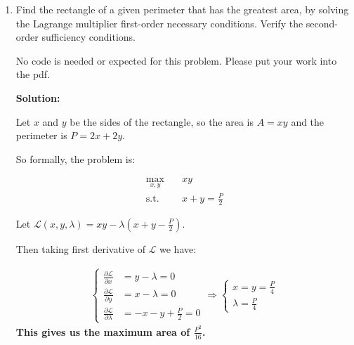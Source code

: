 \documentclass[conference,onecolumn]{IEEEtran}
\begin{document}
\begin{enumerate}
            \clearpage
      \item Find the rectangle of a given perimeter that has the greatest area, by solving the Lagrange multiplier first-order necessary conditions.
            Verify the second-order sufficiency conditions.

            No code is needed or expected for this problem.
            Please put your work into the pdf.

            \textbf{Solution:}

            Let $x$ and $y$ be the sides of the rectangle, so the area is $A = xy$ and the perimeter is $P = 2x + 2y$.

            So formally, the problem is:

            \begin{align*}
                  \max_{x, y} & \quad xy                  \\
                  \text{s.t.} & \quad x + y = \frac{P}{2}
            \end{align*}

            Let $\mathcal{L}(x, y, \lambda) = xy - \lambda(x + y - \frac{P}{2})$.

            Then taking first derivative of $\mathcal{L}$ we have:

            \begin{align*}
                  \begin{cases}
                        \frac{\partial \mathcal{L}}{\partial x}       & = y - \lambda = 0          \\
                        \frac{\partial \mathcal{L}}{\partial y}       & = x - \lambda = 0          \\
                        \frac{\partial \mathcal{L}}{\partial \lambda} & = -x - y + \frac{P}{2} = 0
                  \end{cases} \Rightarrow
                  \begin{cases}
                        x = y = \frac{P}{4} \\
                        \lambda = \frac{P}{4}
                  \end{cases}
            \end{align*}
            \textbf{This gives us the maximum area of $\frac{P^2}{16}$.}


\end{enumerate}
\end{document}
